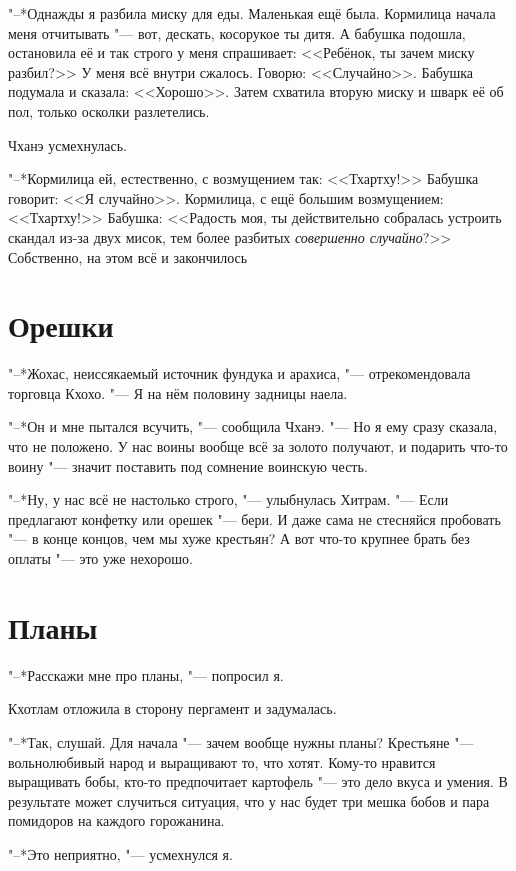 "--*Однажды я разбила миску для еды.
Маленькая ещё была.
Кормилица начала меня отчитывать "--- вот, дескать, косорукое ты дитя.
А бабушка подошла, остановила её и так строго у меня спрашивает: <<Ребёнок, ты зачем миску разбил?>>
У меня всё внутри сжалось.
Говорю: <<Случайно>>.
Бабушка подумала и сказала: <<Хорошо>>.
Затем схватила вторую миску и шварк её об пол, только осколки разлетелись.

Чханэ усмехнулась.

"--*Кормилица ей, естественно, с возмущением так: <<Тхартху!>>
Бабушка говорит: <<Я случайно>>.
Кормилица, с ещё большим возмущением: <<Тхартху!>>
Бабушка: <<Радость моя, ты действительно собралась устроить скандал из-за двух мисок, тем более разбитых \textit{совершенно случайно}?>>
Собственно, на этом всё и закончилось\ldotst

\section{Орешки}

"--*Жохас, неиссякаемый источник фундука и арахиса, "--- отрекомендовала торговца Кхохо.
"--- Я на нём половину задницы наела.

"--*Он и мне пытался всучить, "--- сообщила Чханэ.
"--- Но я ему сразу сказала, что не положено.
У нас воины вообще всё за золото получают, и подарить что-то воину "--- значит поставить под сомнение воинскую честь.

"--*Ну, у нас всё не настолько строго, "--- улыбнулась Хитрам.
"--- Если предлагают конфетку или орешек "--- бери.
И даже сама не стесняйся пробовать "--- в конце концов, чем мы хуже крестьян?
А вот что-то крупнее брать без оплаты "--- это уже нехорошо.

\section{Планы}

"--*Расскажи мне про планы, "--- попросил я.

Кхотлам отложила в сторону пергамент и задумалась.

"--*Так, слушай.
Для начала "--- зачем вообще нужны планы?
Крестьяне "--- вольнолюбивый народ и выращивают то, что хотят.
Кому-то нравится выращивать бобы, кто-то предпочитает картофель "--- это дело вкуса и умения.
В результате может случиться ситуация, что у нас будет три мешка бобов и пара помидоров на каждого горожанина.

"--*Это неприятно, "--- усмехнулся я.

